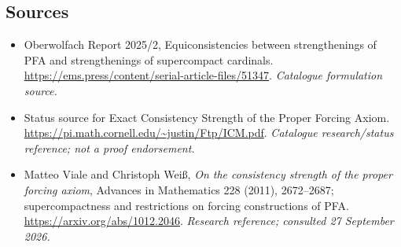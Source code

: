 \documentclass[11pt,a4paper]{article}
\numberwithin{equation}{section}
\begin{document}
\subsection{Sources}
\begin{itemize}\raggedright
\item[\textnormal{[S1]}]\hypertarget{source:30006783:1}{} Oberwolfach Report 2025/2, Equiconsistencies between strengthenings of PFA and strengthenings of supercompact cardinals.
\url{https://ems.press/content/serial-article-files/51347}.
{\small\textit{Catalogue formulation source.}}
\item[\textnormal{[S2]}]\hypertarget{source:30006783:2}{} Status source for Exact Consistency Strength of the Proper Forcing Axiom.
\url{https://pi.math.cornell.edu/~justin/Ftp/ICM.pdf}.
{\small\textit{Catalogue research/status reference; not a proof endorsement.}}
\item[\textnormal{[E1]}]\hypertarget{extra:30006783:1}{} Matteo Viale and Christoph Wei\ss, \emph{On the consistency strength of the proper forcing axiom}, Advances in Mathematics 228 (2011), 2672--2687; supercompactness and restrictions on forcing constructions of PFA.
\url{https://arxiv.org/abs/1012.2046}.
{\small\textit{Research reference; consulted 27 September 2026.}}
\end{itemize}
\end{document}
